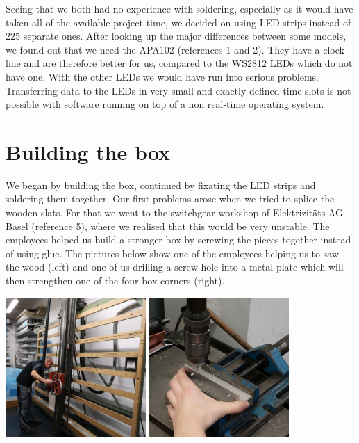 \documentclass[a4paper,12pt]{article}
\begin{document}
 Seeing that we both had no experience with soldering, especially as it would have taken all of the available project time, we decided on using LED strips instead of 225 separate ones.
 After looking up the major differences between some models, we found out that we need the APA102 (references 1 and 2).
 They have a clock line and are therefore better for us, compared to the WS2812 LEDs which do not have one.
 With the other LEDs we would have run into serious problems.
 Transferring data to the LEDs in very small and exactly defined time slots is not possible with software running on top of a non real-time operating system.

\section{Building the box}
 We began by building the box, continued by fixating the LED strips and soldering them together.
 Our first problems arose when we tried to splice the wooden slats.
 For that we went to the switchgear workshop of Elektrizitäts AG Basel (reference 5), where we realised that this would be very unstable.
 The employees helped us build a stronger box by screwing the pieces together instead of using glue.
 The pictures below show one of the employees helping us to saw the wood (left) and one of us drilling a screw hole into a metal plate which will then strengthen one of the four box corners (right).
 
\vspace{1cm}

{ \centering
  \includegraphics[width = 0.4\textwidth]{brice.jpg}
  \space{   }
  \includegraphics[width = 0.4\textwidth]{bohren.jpg}
  \\}
 \vspace{1cm}
 
\end{document}
